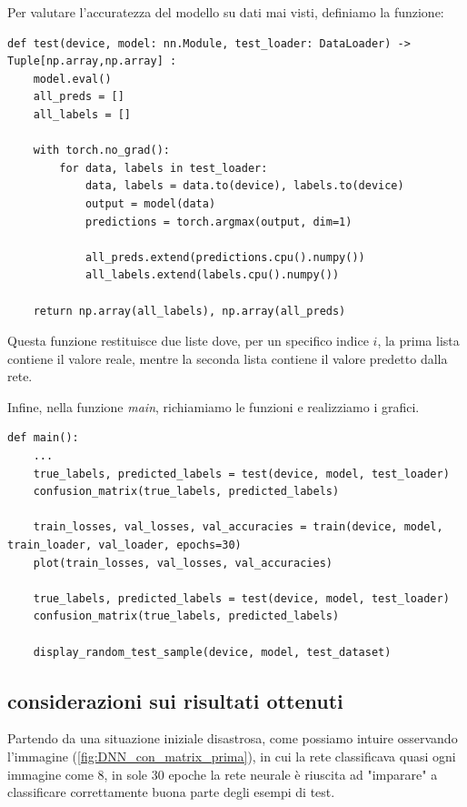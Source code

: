 Per valutare l'accuratezza del modello su dati mai visti, 
definiamo la funzione:

\begin{lstlisting}
def test(device, model: nn.Module, test_loader: DataLoader) -> Tuple[np.array,np.array] :
    model.eval()
    all_preds = []
    all_labels = []

    with torch.no_grad():
        for data, labels in test_loader:
            data, labels = data.to(device), labels.to(device)
            output = model(data)
            predictions = torch.argmax(output, dim=1)

            all_preds.extend(predictions.cpu().numpy())
            all_labels.extend(labels.cpu().numpy())

    return np.array(all_labels), np.array(all_preds)
\end{lstlisting}

Questa funzione restituisce due liste dove, per un specifico indice $i$, la prima 
lista contiene il valore reale, mentre la seconda lista contiene il valore 
predetto dalla rete.


Infine, nella funzione \textit{main}, richiamiamo le funzioni e realizziamo i grafici.
\begin{lstlisting}
def main():
    ...
    true_labels, predicted_labels = test(device, model, test_loader)
    confusion_matrix(true_labels, predicted_labels)

    train_losses, val_losses, val_accuracies = train(device, model, train_loader, val_loader, epochs=30)
    plot(train_losses, val_losses, val_accuracies)

    true_labels, predicted_labels = test(device, model, test_loader)
    confusion_matrix(true_labels, predicted_labels)

    display_random_test_sample(device, model, test_dataset)
\end{lstlisting}

\newpage
\subsection{considerazioni sui risultati ottenuti}
Partendo da una situazione iniziale disastrosa, come possiamo intuire osservando 
l'immagine (\ref{fig:DNN_con_matrix_prima}), in cui la rete classificava 
quasi ogni immagine come $8$, in sole $30$ epoche la rete neurale è 
riuscita ad "imparare" a classificare correttamente 
buona parte degli esempi di test.

